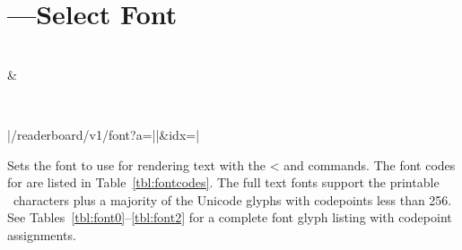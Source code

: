 \section{---Select Font}
\begin{center}
\begin{bytefield}[endianness=little,bitwidth=0.11111\textwidth]{2}
	 \\
	 &
\end{bytefield}
\\
\begin{Coding}
	|/readerboard/v1/font?a=||&idx=|
\end{Coding}
\end{center}

Sets the font to use for rendering text with the \z< and  commands.
The font codes for  are listed in Table~\ref{tbl:fontcodes}.
The full text fonts support the printable \ascii\ characters plus a majority
of the Unicode glyphs with codepoints less than 256.  See Tables~\ref{tbl:font0}--\ref{tbl:font2}
for a complete font glyph listing with codepoint assignments.

